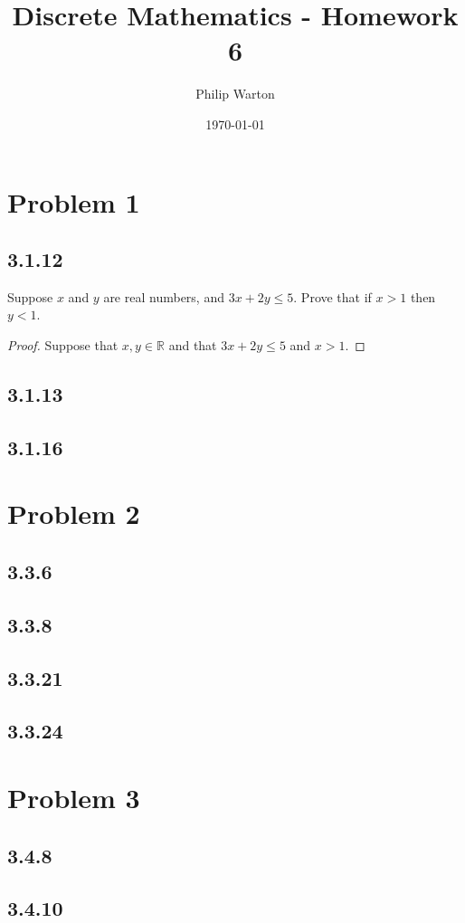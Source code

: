 \documentclass{article}
\theoremstyle{definition}
\begin{document}
\title{Discrete Mathematics - Homework 6}
\author{Philip Warton}
\date{\today}
\maketitle
\section*{Problem 1}
\subsection*{3.1.12}
\begin{mdframed}[]
    Suppose $x$ and $y$ are real numbers, and $3x + 2y \leqslant 5$. Prove that if $x > 1$
    then $y < 1$.
\end{mdframed}
\begin{proof}
    Suppose that $x,y \in \mathbb{R}$ and that $3x + 2y \leqslant 5$ and $x > 1$.
\end{proof}
\subsection*{3.1.13}
\subsection*{3.1.16}
\section*{Problem 2}
\subsection*{3.3.6}
\subsection*{3.3.8}
\subsection*{3.3.21}
\subsection*{3.3.24}
\section*{Problem 3}
\subsection*{3.4.8}
\subsection*{3.4.10}
\end{document}
